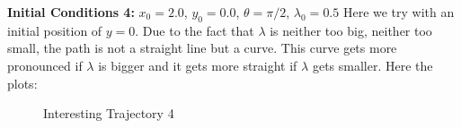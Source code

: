 \documentclass[10pt,a4paper]{article}
\begin{document}
\textbf{Initial Conditions 4:} $x_{0} = 2.0$, $y_{0} = 0.0$, $\theta = \pi / 2 $, $\lambda_{0} = 0.5$
Here we try with an initial position of $y = 0$. Due to the fact that $\lambda$ is neither too big, neither too small, the path is not a straight line but a curve. This  curve gets more pronounced if $\lambda$ is bigger and it gets more straight if $\lambda$ gets smaller. Here the plots:

	\begin{figure}[h]
			\centering
            \caption{ Interesting Trajectory 4 }
            \label{fig:Q2b4}
	\end{figure}
\end{document}
